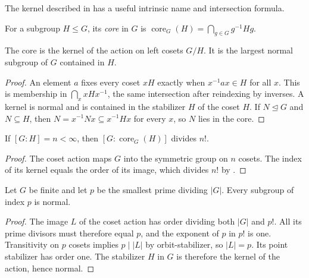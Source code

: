 The kernel described in 
has a useful intrinsic name and intersection formula.

\begin{definition}\label{core-subgroup}
For a subgroup $H\le G$, its \emph{core} in $G$ is
$\operatorname{core}_G(H)=\bigcap_{g\in G}g^{-1}Hg$.
\end{definition}
\begin{proposition}\label{core-action-kernel}
The core is the kernel of the action on left cosets $G/H$.
It is the largest normal subgroup of $G$ contained in $H$.
\end{proposition}
\begin{proof}\label{core-action-kernel-proof}
An element $a$ fixes every coset $xH$ exactly when $x^{-1}ax\in H$
for all $x$. This is membership in $\bigcap_x xHx^{-1}$, the same
intersection after reindexing by inverses. A kernel is normal and is
contained in the stabilizer $H$ of the coset $H$.
If $N\trianglelefteq G$ and $N\subseteq H$, then
$N=x^{-1}Nx\subseteq x^{-1}Hx$ for every $x$, so $N$ lies in the core.
\end{proof}
\begin{corollary}\label{core-factorial-bound}
If $[G:H]=n<\infty$, then $[G:\operatorname{core}_G(H)]$ divides $n!$.
\end{corollary}
\begin{proof}\label{core-factorial-bound-proof}
The coset action maps $G$ into the symmetric group on $n$ cosets.
The index of its kernel equals the order of its image, which divides
$n!$ by .
\end{proof}
\begin{theorem}\label{smallest-prime-index}
Let $G$ be finite and let $p$ be the smallest prime dividing $|G|$.
Every subgroup of index $p$ is normal.
\end{theorem}
\begin{proof}\label{smallest-prime-index-proof}
The image $L$ of the coset action has order dividing both $|G|$ and
$p!$. All its prime divisors must therefore equal $p$, and the
exponent of $p$ in $p!$ is one. Transitivity on $p$ cosets implies
$p\mid|L|$ by orbit-stabilizer, so $|L|=p$.
Its point stabilizer has order one. The stabilizer $H$ in $G$ is
therefore the kernel of the action, hence normal.
\end{proof}
